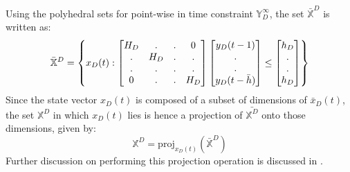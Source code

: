 \documentclass[letterpaper, 10 pt, conference]{ieeeconf}  %
\begin{document}
Using the polyhedral sets for point-wise in time constraint $\mathbb{Y}_D^{\infty}$, the set $\bar{\mathbb{X}}^D$ is written as:
\begin{equation}
\small
\bar{\mathbb{X}}^D = \begin{Bmatrix}x_D(t):\begin{bmatrix} H_D & . & . & 0 \\ . & H_D & . & . \\ . & . & . & . \\ 0 & . & . & H_D \end{bmatrix} \begin{bmatrix} y_D(t-1) \\ . \\ . \\ y_D(t-\bar{h}) \end{bmatrix} \leq \begin{bmatrix} h_D \\ . \\. \\ h_D \end{bmatrix}\end{Bmatrix}
\end{equation}
Since the state vector $x_D(t)$ is composed of a subset of dimensions of $\bar{x}_D(t)$, the set $\mathbb{X}^D$ in which $x_D(t)$ lies is hence a projection of $\bar{\mathbb{X}^D}$ onto those dimensions, given by:
\begin{equation}
\mathbb{X}^D = \text{proj}_{x_D(t)}(\bar{\mathbb{X}}^D)
\end{equation}
Further discussion on performing this projection operation is discussed in \cite{Predictivecontrol}.

\end{document}

